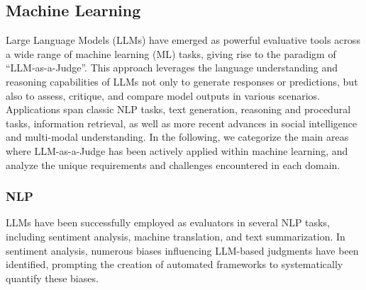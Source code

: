 

\subsection{Machine Learning}



Large Language Models (LLMs) have emerged as powerful evaluative tools across a wide range of machine learning (ML) tasks, giving rise to the paradigm of ``LLM-as-a-Judge''. This approach leverages the language understanding and reasoning capabilities of LLMs not only to generate responses or predictions, but also to assess, critique, and compare model outputs in various scenarios. Applications span classic NLP tasks, text generation, reasoning and procedural tasks, information retrieval, as well as more recent advances in social intelligence and multi-modal understanding. In the following, we categorize the main areas where LLM-as-a-Judge has been actively applied within machine learning, and analyze the unique requirements and challenges encountered in each domain.


\subsubsection{\textbf{NLP}} LLMs have been successfully employed as evaluators in several NLP tasks, including sentiment analysis, machine translation, and text summarization. In sentiment analysis, numerous biases influencing LLM-based judgments have been identified, prompting the creation of automated frameworks to systematically quantify these biases. 


